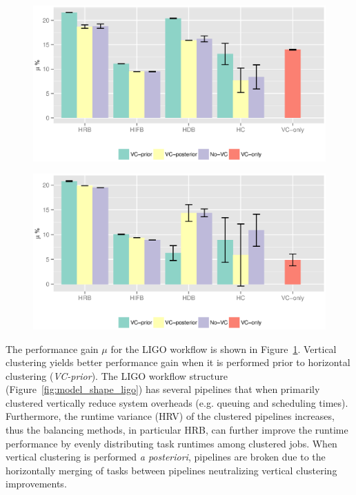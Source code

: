 \begin{figure}[!htb]
	\centering
	\includegraphics[width=0.8\linewidth]{figures/balance/figure26.eps}
	\label{fig:evaluation_vc_ligo}
\end{figure}


\begin{figure}[!htb]
	\centering
	\includegraphics[width=0.8\linewidth]{figures/balance/figure27.eps}
	\label{fig:evaluation_vc_genome}
\end{figure}

The performance gain $\mu$ for the LIGO workflow is shown in Figure~\ref{fig:evaluation_vc_ligo}. Vertical clustering yields better performance gain when it is performed prior to horizontal clustering (\emph{VC-prior}). The LIGO workflow structure (Figure~\ref{fig:model_shape_ligo}) has several pipelines that when primarily clustered vertically reduce system overheads (e.g. queuing and scheduling times). Furthermore, the runtime variance (HRV) of the clustered pipelines increases, thus the balancing methods, in particular HRB, can further improve the runtime performance by evenly distributing task runtimes among clustered jobs. When vertical clustering is performed \emph{a posteriori}, pipelines are broken due to the horizontally merging of tasks between pipelines neutralizing vertical clustering improvements.





